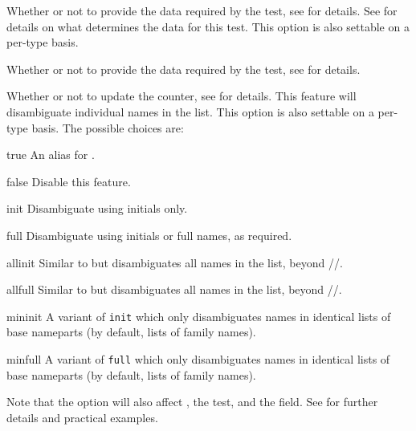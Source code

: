 \documentclass{ltxdockit}[2011/03/25]
\begin{document}
\begin{optionlist}

Whether or not to provide the data required by the  test, see  for details. See  for details on what determines the data for this test.
This option is also settable on a per-type basis.


Whether or not to provide the data required by the  test, see  for details.


Whether or not to update the  counter, see  for details. This feature will disambiguate individual names in the  list. This option is also settable on a per-type basis. The possible choices are:

\begin{valuelist}
\item[true] An alias for .
\item[false] Disable this feature.
\item[init] Disambiguate using initials only.
\item[full] Disambiguate using initials or full names, as required.
\item[allinit] Similar to  but disambiguates all names in the  list, beyond \slash {}\slash {}.
\item[allfull] Similar to  but disambiguates all names in the  list, beyond \slash {}\slash {}.
\item[mininit] A variant of \texttt{init} which only disambiguates names in identical lists of base nameparts (by default, lists of family names).
\item[minfull] A variant of \texttt{full} which only disambiguates names in identical lists of base nameparts (by default, lists of family names).
\end{valuelist}
%
Note that the  option will also affect , the  test, and the  field. See  for further details and practical examples.



\end{optionlist}
\end{document}
